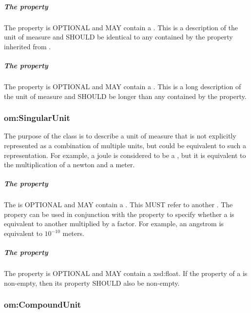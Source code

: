 \subparagraph{The  property}\label{sec:om:comment:Unit}
The  property is OPTIONAL and MAY contain a . This  is a description of the unit of measure and SHOULD be identical to any  contained by the  property inherited from .

\subparagraph{The  property}\label{sec:om:longcomment:Unit}
The  property is OPTIONAL and MAY contain a . This  is a long description of the unit of measure and SHOULD be longer than any  contained by the  property.

\subsubsection{om:SingularUnit}
\label{sec:om:SingularUnit}

The purpose of the  class is to describe a unit of measure that is not explicitly represented as a combination of multiple units, but could be equivalent to such a representation. For example, a joule is considered to be a , but it is equivalent to the multiplication of a newton and a meter.

\subparagraph{The  property}\label{sec:om:hasUnit:SingularUnit}
The  is OPTIONAL and MAY contain a . This  MUST refer to another . The  propery can be used in conjunction with the  property to specify whether a  is equivalent to another  multiplied by a factor. For example, an angstrom is equivalent to $10^{-10}$ meters.

\subparagraph{The  property}\label{sec:om:hasFactor:SingularUnit}
The  property is OPTIONAL and MAY contain a xsd:float. If the  property of a  is non-empty, then its  property SHOULD also be non-empty.

\subsubsection{om:CompoundUnit}
\label{sec:om:CompoundUnit}


